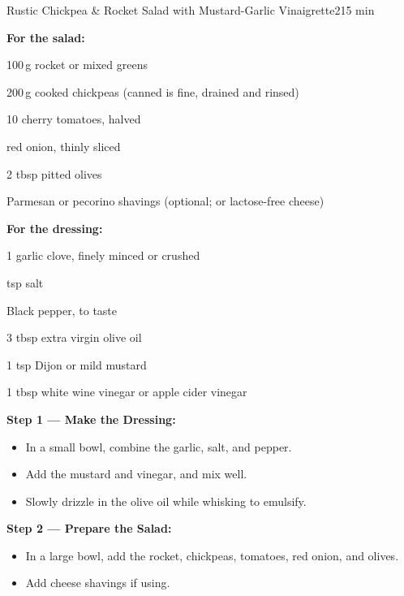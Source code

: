 \begin{recipebox}{Rustic Chickpea \& Rocket Salad with Mustard-Garlic Vinaigrette}{2}{15 min}

  \begin{ingredients}
    \item \textbf{For the salad:}
    \item 100\,g rocket or mixed greens
    \item 200\,g cooked chickpeas (canned is fine, drained and rinsed)
    \item 10 cherry tomatoes, halved
    \item {} red onion, thinly sliced
    \item 2 tbsp pitted olives
    \item Parmesan or pecorino shavings (optional; or lactose-free cheese)
    \vspace{0.6em}
    \item \textbf{For the dressing:}
    \item 1 garlic clove, finely minced or crushed
    \item {} tsp salt
    \item Black pepper, to taste
    \item 3 tbsp extra virgin olive oil
    \item 1 tsp Dijon or mild mustard
    \item 1 tbsp white wine vinegar or apple cider vinegar
  \end{ingredients}

  \vspace{-0.5em}
  \begin{method}

    \item \textbf{Step 1 — Make the Dressing:}
    \begin{itemize}[leftmargin=2em]
      \item In a small bowl, combine the garlic, salt, and pepper.
      \item Add the mustard and vinegar, and mix well.
      \item Slowly drizzle in the olive oil while whisking to emulsify.
    \end{itemize}

    \vspace{0.8em}

    \item \textbf{Step 2 — Prepare the Salad:}
    \begin{itemize}[leftmargin=2em]
      \item In a large bowl, add the rocket, chickpeas, tomatoes, red onion, and olives.
      \item Add cheese shavings if using.
    \end{itemize}


\end{method}
\end{recipebox}
